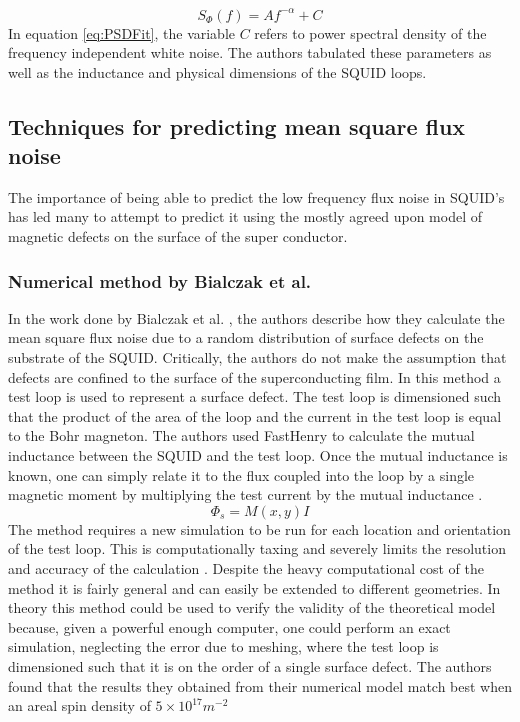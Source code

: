 \begin{equation}
    S_\Phi(f) = Af^{-\alpha} + C
    \label{eq:PSDFit}
\end{equation}
In equation \ref{eq:PSDFit}, the variable $C$ refers to power spectral density of the frequency independent white noise. The authors tabulated these parameters as well as the inductance and physical dimensions of the SQUID loops.

\subsection{Techniques for predicting mean square flux noise}
\label{subsec:PredictFluxNoise}
The importance of being able to predict the low frequency flux noise in SQUID's has led many to attempt to predict it using the mostly agreed upon model of magnetic defects on the surface of the super conductor.

\subsubsection*{Numerical method by Bialczak et al.}
In the work done by Bialczak et al. \cite{BialczakTestLoop}, the authors describe how they calculate the mean square flux noise due to a random distribution of surface defects on the substrate of the SQUID. Critically, the authors do not make the assumption that defects are confined to the surface of the superconducting film. In this method a test loop is used to represent a surface defect. The test loop is dimensioned such that the product of the area of the loop and the current in the test loop is equal to the Bohr magneton. The authors used FastHenry to calculate the mutual inductance between the SQUID and the test loop. Once the mutual inductance is known, one can simply relate it to the flux coupled into the loop by a single magnetic moment by multiplying the test current by the mutual inductance \cite{BialczakTestLoop}. 
\begin{equation}
    \Phi_s = M(x,y)I
    \label{eq:FluxCoupleBial}
\end{equation}
The method requires a new simulation to be run for each location and orientation of the test loop. This is computationally taxing and severely limits the resolution and accuracy of the calculation \cite{fluxNoiseSquidsStevenAnton}. Despite the heavy computational cost of the method it is fairly general and can easily be extended to different geometries. In theory this method could be used to verify the validity of the theoretical model because, given a powerful enough computer, one could perform an exact simulation, neglecting the error due to meshing, where the test loop is dimensioned such that it is on the order of a single surface defect. The authors found that the results they obtained from their numerical model match best when an areal spin density of $5\times10^{17}\si{m^{-2}}$

